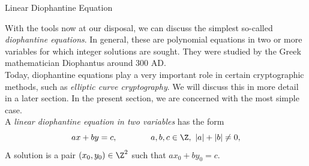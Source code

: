 \documentclass[smaller,hyperref={CJKbookmarks=true}]{beamer}
\begin{document}
\begin{frame}[c]{Linear Diophantine Equation}
\begin{spacing}{1.05}
With the tools now at our disposal, we can discuss the simplest so-called
\emph{diophantine equations}. In general, these are polynomial equations in two
or more variables for which integer solutions are sought. They were
studied by the Greek mathematician Diophantus around 300 AD.\\[4pt]
Today, diophantine equations play a very important role in certain
cryptographic methods, such as \emph{elliptic curve cryptography}. We will
discuss this in more detail in a later section. In the present section, we are
concerned with the most simple case.\\[4pt]
A \emph{linear diophantine equation in two variables} has the form
\begin{equation}\label{1.6.4}
 ax+by=c,\qquad\qquad a,b,c\in\Z,~|a|+|b|\neq0,
\end{equation}
A solution is a pair $(x_0,y_0)\in\Z^2$ such that $ax_0+by_0=c$.
\end{spacing}
\end{frame}
\end{document}
